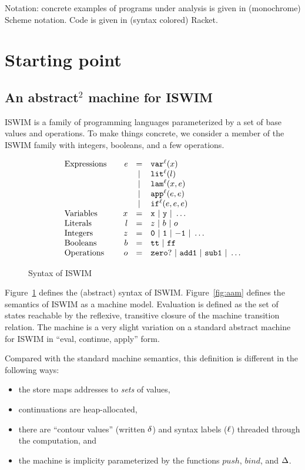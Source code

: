 \documentclass[preprint,onecolumn,9pt]{sigplanconf} %
\begin{document}
Notation: concrete examples of programs under analysis is given in
(monochrome) Scheme notation.  Code is given in (syntax colored)
Racket.

\newpage
\section{Starting point}
\subsection{An abstract$^2$ machine for ISWIM}

ISWIM is a family of programming languages parameterized by a set of
base values and operations.  To make things concrete, we consider a
member of the ISWIM family with integers, booleans, and a few
operations.

\begin{figure}
\[
\begin{array}{l@{\qquad}rcl}
\text{Expressions} & \mathit{e} &=& \svar[^\mlab]\mvar\\
&&|& \slit[^\mlab]\mlit\\
&&|& \slam[^\mlab]\mvar\mexp\\
&&|& \sapp[^\mlab]\mexp\mexp \\
&&|& \sif[^\mlab]\mexp\mexp\mexp \\
\text{Variables}&\mvar &=& \syntax{x}\ |\ \syntax{y}\ |\ \dots\\
\text{Literals}&\mlit &=& \mnum\ |\ \mbln\ |\ \mop\\
\text{Integers}&\mnum &=& \syntax{0}\ |\ \syntax{1}\ |\ \syntax{-1}\ |\ \dots\\
\text{Booleans}&\mbln &=& \strue\ |\ \sfalse\\
\text{Operations}&\mop &=& \syntax{zero?}\ |\ \syntax{add1}\ |\ \syntax{sub1}\ |\ \dots
\end{array}
\]
\caption{Syntax of ISWIM}
\label{fig:syntax}
\end{figure}

Figure~\ref{fig:syntax} defines the (abstract) syntax of ISWIM.
Figure~\ref{fig:aam} defines the semantics of ISWIM as a machine
model.  Evaluation is defined as the set of states reachable by the
reflexive, transitive closure of the machine transition relation.  The
machine is a very slight variation on a standard abstract machine for
ISWIM in ``eval, continue, apply'' form.

Compared with the standard machine semantics, this definition is
different in the following ways:
\begin{itemize}
\item the store maps addresses to \emph{sets} of values,
\item continuations are heap-allocated,
\item there are ``contour values'' (written ${\delta}$) and syntax
  labels (${\ell}$) threaded through the computation, and
\item the machine is implicity parameterized by the functions
  $\mathit{push}$, $\mathit{bind}$, and $\Delta$.
\end{itemize}
\end{document}
